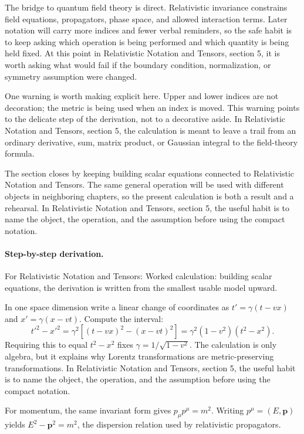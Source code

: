 The bridge to quantum field theory is direct.  Relativistic invariance constrains field equations, propagators, phase space, and allowed interaction terms.  Later notation will carry more indices and fewer verbal reminders, so the safe habit is to keep asking which operation is being performed and which quantity is being held fixed.  At this point in Relativistic Notation and Tensors, section 5, it is worth asking what would fail if the boundary condition, normalization, or symmetry assumption were changed.

One warning is worth making explicit here.  Upper and lower indices are not decoration; the metric is being used when an index is moved.  This warning points to the delicate step of the derivation, not to a decorative aside.  In Relativistic Notation and Tensors, section 5, the calculation is meant to leave a trail from an ordinary derivative, sum, matrix product, or Gaussian integral to the field-theory formula.

The section closes by keeping building scalar equations connected to Relativistic Notation and Tensors.  The same general operation will be used with different objects in neighboring chapters, so the present calculation is both a result and a rehearsal.  In Relativistic Notation and Tensors, section 5, the useful habit is to name the object, the operation, and the assumption before using the compact notation.



\paragraph{Step-by-step derivation.}

For Relativistic Notation and Tensors: Worked calculation: building scalar equations, the derivation is written from the smallest usable model upward.

In one space dimension write a linear change of coordinates as \(t'=\gamma(t-vx)\) and \(x'=\gamma(x-vt)\).  Compute the interval:
\[
  t'^2-x'^2
  =
  \gamma^2[(t-vx)^2-(x-vt)^2]
  =
  \gamma^2(1-v^2)(t^2-x^2).
\]
Requiring this to equal \(t^2-x^2\) fixes \(\gamma=1/\sqrt{1-v^2}\).  The calculation is only algebra, but it explains why Lorentz transformations are metric-preserving transformations.  In Relativistic Notation and Tensors, section 5, the useful habit is to name the object, the operation, and the assumption before using the compact notation.

For momentum, the same invariant form gives \(p_\mu p^\mu=m^2\).  Writing \(p^\mu=(E,\bm p)\) yields \(E^2-\bm p^2=m^2\), the dispersion relation used by relativistic propagators.

